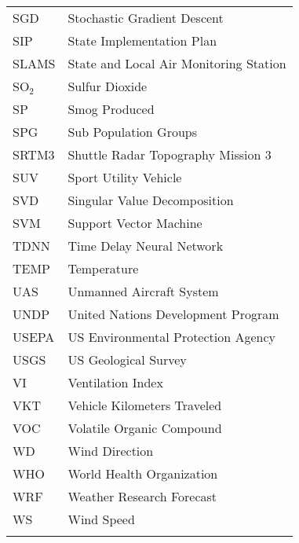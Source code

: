 \begin{longtable}{ll}
SGD & Stochastic Gradient Descent \\
SIP & State Implementation Plan \\
SLAMS & State and Local Air Monitoring Station \\
SO$_{2}$ & Sulfur Dioxide \\
SP & Smog Produced \\
SPG & Sub Population Groups \\
SRTM3 & Shuttle Radar Topography Mission 3 \\
SUV & Sport Utility Vehicle \\
SVD & Singular Value Decomposition \\
SVM & Support Vector Machine \\
TDNN & Time Delay Neural Network \\
TEMP & Temperature \\
UAS & Unmanned Aircraft System \\
UNDP & United Nations Development Program \\
USEPA & US Environmental Protection Agency \\
USGS & US Geological Survey \\
VI & Ventilation Index \\
VKT & Vehicle Kilometers Traveled \\
VOC & Volatile Organic Compound \\
WD & Wind Direction \\
WHO & World Health Organization \\
WRF & Weather Research Forecast \\
WS & Wind Speed \\
\\ \hline
\end{longtable}

\clearpage
